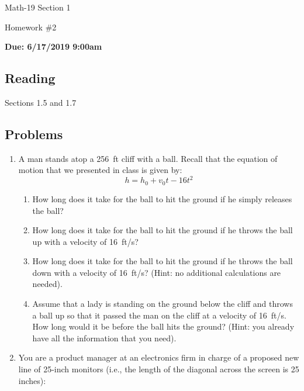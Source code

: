 \documentclass[letterpaper,12pt,fleqn]{article}
\begin{document}
\begin{center}
  \large
  Math-19 Section 1

  \Large
  Homework \#2

  \large
  \textbf{Due: 6/17/2019 9:00am}
\end{center}

\subsection*{Reading}

Sections 1.5 and 1.7

\subsection*{Problems}

\begin{enumerate}
\item A man stands atop a \SI{256}{ft} cliff with a  ball.  Recall that the equation of motion that we presented in
  class is given by:
  \[h=h_0+v_0t-16t^2\]
  \begin{enumerate}
  \item How long does it take for the ball to hit the ground if he simply releases the ball?

  \item How long does it take for the ball to hit the ground if he throws the ball up with a velocity of \SI{16}{ft/s}?

  \item How long does it take for the ball to hit the ground if he throws the ball down with a velocity of
    \SI{16}{ft/s}? (Hint: no additional calculations are needed).

  \item Assume that a lady is standing on the ground below the cliff and throws a ball up so that it passed the man
    on the cliff at a velocity of \SI{16}{ft/s}.  How long would it be before the ball hits the ground? (Hint: you
    already have all the information that you need).
  \end{enumerate}

\item You are a product manager at an electronics firm in charge of a proposed new line of 25-inch monitors (i.e.,
  the length of the diagonal across the screen is 25 inches):



\end{enumerate}
\end{document}
